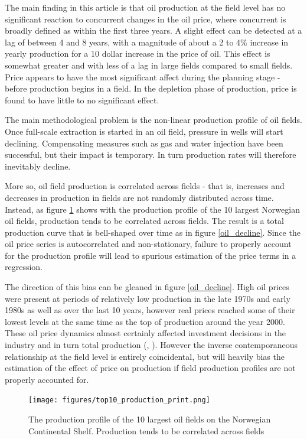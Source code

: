 \documentclass[11pt]{article}
\begin{document}
The main finding in this article is that oil production at the field level has no significant reaction to concurrent changes in the oil price, where concurrent is broadly defined as within the first three years.  A slight effect can be detected at a lag of between 4 and 8 years, with a magnitude of about a 2 to 4\% increase in yearly production for a 10 dollar increase in the price of oil.  This effect is somewhat greater and with less of a lag in large fields compared to small fields.  Price appears to have the most significant affect during the planning stage - before production begins in a field.  In the depletion phase of production, price is found to have little to no significant effect.  

The main methodological problem is the non-linear production profile of oil fields.  Once full-scale extraction is started in an oil field, pressure in wells will start declining. Compensating measures such as gas and water injection have been successful, but their impact is temporary. In turn production rates will therefore inevitably decline.

More so, oil field production is correlated across fields - that is, increases and decreases in production in fields are not randomly distributed across time.  Instead, as figure \ref{top10_production} shows with the production profile of the 10 largest Norwegian oil fields, production tends to be correlated across fields.  The result is a total production curve that is bell-shaped over time as in figure \ref{oil_decline}.  Since the oil price series is autocorrelated and non-stationary, failure to properly account for the production profile will lead to spurious estimation of the price terms in a regression.

The direction of this bias can be gleaned in figure \ref{oil_decline}.  High oil prices were present at periods of relatively low production in the late 1970s and early 1980s as well as over the last 10 years, however real prices reached some of their lowest levels at the same time as the top of production around the year 2000. These oil price dynamics almost certainly affected investment decisions in the industry and in turn total production (\citep{osmundsen_is_2007}, \citep{aune_financial_2010}). However the inverse contemporaneous relationship at the field level is entirely coincidental, but will heavily bias the estimation of the effect of price on production if field production profiles are not properly accounted for. 

\begin{figure}
	\texttt{[image: figures/top10\_production\_print.png]}
	\caption{The production profile of the 10 largest oil fields on the Norwegian Continental Shelf.  Production tends to be correlated across fields}
	\label{top10_production}	
	\end{figure}
\end{document}
